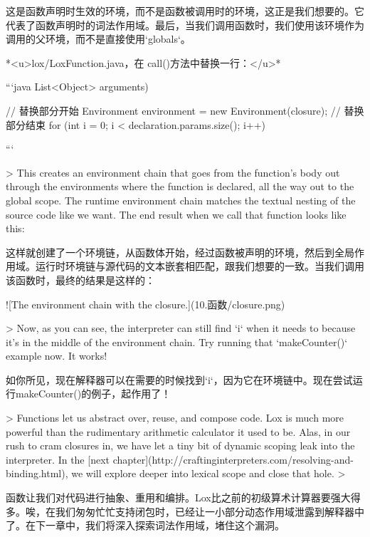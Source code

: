 \documentclass[cn,11pt,chinese]{elegantbook}
\begin{document}
{{{{{{{{{{这是函数声明时生效的环境，而不是函数被调用时的环境，这正是我们想要的。它代表了函数声明时的词法作用域。最后，当我们调用函数时，我们使用该环境作为调用的父环境，而不是直接使用`globals`。

*<u>lox/LoxFunction.java，在 call()方法中替换一行：</u>*

```java
                      List<Object> arguments) {
    // 替换部分开始                  
    Environment environment = new Environment(closure);
    // 替换部分结束
    for (int i = 0; i < declaration.params.size(); i++) {
```

> This creates an environment chain that goes from the function’s body out through the environments where the function is declared, all the way out to the global scope. The runtime environment chain matches the textual nesting of the source code like we want. The end result when we call that function looks like this:

这样就创建了一个环境链，从函数体开始，经过函数被声明的环境，然后到全局作用域。运行时环境链与源代码的文本嵌套相匹配，跟我们想要的一致。当我们调用该函数时，最终的结果是这样的：

![The environment chain with the closure.](10.函数/closure.png)

> Now, as you can see, the interpreter can still find `i` when it needs to because it’s in the middle of the environment chain. Try running that `makeCounter()` example now. It works!

如你所见，现在解释器可以在需要的时候找到`i`，因为它在环境链中。现在尝试运行makeCounter()的例子，起作用了！ 

> Functions let us abstract over, reuse, and compose code. Lox is much more powerful than the rudimentary arithmetic calculator it used to be. Alas, in our rush to cram closures in, we have let a tiny bit of dynamic scoping leak into the interpreter. In the [next chapter](http://craftinginterpreters.com/resolving-and-binding.html), we will explore deeper into lexical scope and close that hole.
>

函数让我们对代码进行抽象、重用和编排。Lox比之前的初级算术计算器要强大得多。唉，在我们匆匆忙忙支持闭包时，已经让一小部分动态作用域泄露到解释器中了。在下一章中，我们将深入探索词法作用域，堵住这个漏洞。



}}}}}}}}}}}}
\end{document}
